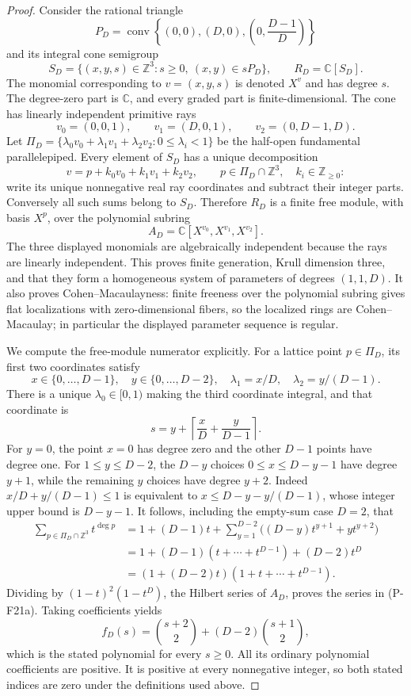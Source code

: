 \begin{proof}
Consider the rational triangle
\[
 P_D=\operatorname{conv}\left\{(0,0),(D,0),
           \left(0,\frac{D-1}{D}\right)\right\}
\]
and its integral cone semigroup
\[
 S_D=\{(x,y,s)\in\mathbb Z^3:s\ge0,\ (x,y)\in sP_D\},
 \qquad R_D=\mathbb C[S_D].
\]
The monomial corresponding to $v=(x,y,s)$ is denoted $X^v$ and
has degree $s$. The degree-zero part is $\mathbb C$, and every graded
part is finite-dimensional. The cone has linearly independent
primitive rays
\[
 v_0=(0,0,1),\qquad v_1=(D,0,1),\qquad v_2=(0,D-1,D).
 \tag{P-F21b}
\]
Let $\Pi_D=\{\lambda_0v_0+\lambda_1v_1+\lambda_2v_2:
0\le\lambda_i<1\}$ be the half-open fundamental parallelepiped.
Every element of $S_D$ has a unique decomposition
\[
 v=p+k_0v_0+k_1v_1+k_2v_2,
 \qquad p\in\Pi_D\cap\mathbb Z^3,\quad k_i\in\mathbb Z_{\ge0}:
\]
write its unique nonnegative real ray coordinates and subtract their
integer parts. Conversely all such sums belong to $S_D$.
Therefore $R_D$ is a finite free module, with basis $X^p$, over the
polynomial subring
\[
 A_D=\mathbb C[X^{v_0},X^{v_1},X^{v_2}].
 \tag{P-F21c}
\]
The three displayed monomials are algebraically independent because
the rays are linearly independent. This proves finite generation,
Krull dimension three, and that they form a homogeneous system of
parameters of degrees $(1,1,D)$. It also proves Cohen--Macaulayness:
finite freeness over the polynomial subring gives flat localizations
with zero-dimensional fibers, so the localized rings are
Cohen--Macaulay; in particular the displayed parameter sequence
is regular.

We compute the free-module numerator explicitly. For a lattice point
$p\in\Pi_D$, its first two coordinates satisfy
\[
 x\in\{0,\ldots,D-1\},\quad
 y\in\{0,\ldots,D-2\},\quad
 \lambda_1=x/D,\quad\lambda_2=y/(D-1).
\]
There is a unique $\lambda_0\in[0,1)$ making the third coordinate
integral, and that coordinate is
\[
 s=y+\left\lceil\frac{x}{D}+\frac{y}{D-1}\right\rceil.
\]
For $y=0$, the point $x=0$ has degree zero and the other $D-1$
points have degree one. For $1\le y\le D-2$, the $D-y$ choices
$0\le x\le D-y-1$ have degree $y+1$, while the remaining $y$
choices have degree $y+2$. Indeed $x/D+y/(D-1)\le1$ is equivalent
to $x\le D-y-y/(D-1)$, whose integer upper bound is $D-y-1$.
It follows, including the empty-sum case $D=2$, that
\begin{align*}
 \sum_{p\in\Pi_D\cap\mathbb Z^3}t^{\deg p}
 &=1+(D-1)t+
       \sum_{y=1}^{D-2}\big((D-y)t^{y+1}+yt^{y+2}\big)\\
 &=1+(D-1)(t+\cdots+t^{D-1})+(D-2)t^D\\
 &=(1+(D-2)t)(1+t+\cdots+t^{D-1}).
\end{align*}
Dividing by $(1-t)^2(1-t^D)$, the Hilbert series of $A_D$, proves
the series in (P-F21a). Taking coefficients yields
\[
 f_D(s)=\binom{s+2}{2}+(D-2)\binom{s+1}{2},
\]
which is the stated polynomial for every $s\ge0$. All its ordinary
polynomial coefficients are positive. It is positive at every
nonnegative integer, so both stated indices are zero under the
definitions used above.


\end{proof}
